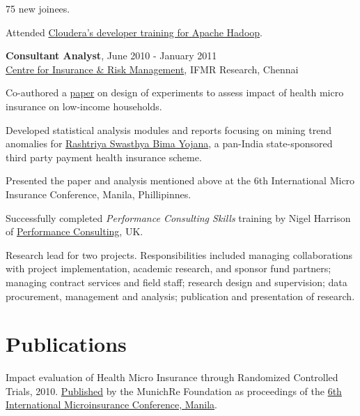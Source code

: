 \documentclass[a4paper,10pt]{article}
\renewenvironment{itemize}{
\begin{list}{}{
  \setlength{\leftmargin}{1.5em}
  }
  }{
\end{list}
}
\begin{document}
{\begin{itemize}
\begin{itemize}
        75 new joinees.
      \item Attended \href{http://university.cloudera.com/course/developer}
        {Cloudera's developer training for Apache Hadoop}.
    \end{itemize}
    \vspace*{\baselineskip} %
  \item \textbf{Consultant Analyst}, June 2010 - January 2011 \\
    \href{http://www.cirm.in/} {Centre for Insurance \& Risk Management},
    IFMR Research, Chennai
    \begin{itemize}
      \item Co-authored a
        \href{http://www.munichre-foundation.org/dms/MRS/Documents/Microinsurance/2010_IMC/S11_MIC2010_Presentation_Behl.pdf}{paper}
        on design of experiments to assess impact of health micro insurance on
        low-income households.
      \item Developed statistical analysis modules and reports focusing on
        mining trend anomalies for
        \href{http://www.rsby.gov.in/}{Rashtriya Swasthya Bima Yojana},
        a pan-India state-sponsored third party payment health
        insurance scheme.
      \item Presented the paper and analysis mentioned above at the 6th
        International Micro Insurance Conference, Manila, Phillipinnes.
      \item Successfully completed \emph{Performance Consulting Skills}
        training by Nigel Harrison of
        \href{http://performconsult.co.uk/}{Performance Consulting}, UK.
      \item Research lead for two projects. Responsibilities included managing
        collaborations with project implementation, academic research, and
        sponsor fund partners; managing contract services and field staff;
        research design and supervision; data procurement, management and
        analysis; publication and presentation of research.
    \end{itemize}
\end{itemize}}

\section*{Publications}
\begin{itemize}
  \item Impact evaluation of Health Micro Insurance through Randomized Controlled Trials, 2010. \href{http://www.munichre-foundation.org/dms/MRS/Documents/Microinsurance/2010_IMC/S11_MIC2010_Paper_Behl.pdf}{Published} by the MunichRe Foundation as proceedings of the \href{http://www.munichre-foundation.org/home/Microinsurance/Microinsurance_Archive/2010IMC.html}{6th International Microinsurance Conference, Manila}.
\end{itemize}
\end{document}
